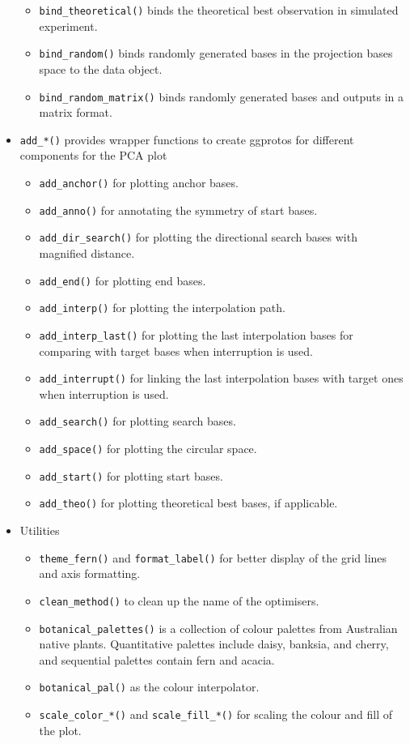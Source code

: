 \begin{itemize}
  \begin{itemize}
  \tightlist
  \item
    \texttt{bind\_theoretical()} binds the theoretical best observation in simulated experiment.
  \item
    \texttt{bind\_random()} binds randomly generated bases in the projection bases space to the data object.
  \item
    \texttt{bind\_random\_matrix()} binds randomly generated bases and outputs in a matrix format.
  \end{itemize}
\item
  \texttt{add\_*()} provides wrapper functions to create ggprotos for different components for the PCA plot

  \begin{itemize}
  \tightlist
  \item
    \texttt{add\_anchor()} for plotting anchor bases.
  \item
    \texttt{add\_anno()} for annotating the symmetry of start bases.
  \item
    \texttt{add\_dir\_search()} for plotting the directional search bases with magnified distance.
  \item
    \texttt{add\_end()} for plotting end bases.
  \item
    \texttt{add\_interp()} for plotting the interpolation path.
  \item
    \texttt{add\_interp\_last()} for plotting the last interpolation bases for comparing with target bases when interruption is used.
  \item
    \texttt{add\_interrupt()} for linking the last interpolation bases with target ones when interruption is used.
  \item
    \texttt{add\_search()} for plotting search bases.
  \item
    \texttt{add\_space()} for plotting the circular space.
  \item
    \texttt{add\_start()} for plotting start bases.
  \item
    \texttt{add\_theo()} for plotting theoretical best bases, if applicable.
  \end{itemize}
\item
  Utilities

  \begin{itemize}
  \tightlist
  \item
    \texttt{theme\_fern()} and \texttt{format\_label()} for better display of the grid lines and axis formatting.
  \item
    \texttt{clean\_method()} to clean up the name of the optimisers.
  \item
    \texttt{botanical\_palettes()} is a collection of colour palettes from Australian native plants. Quantitative palettes include daisy, banksia, and cherry, and sequential palettes contain fern and acacia.
  \item
    \texttt{botanical\_pal()} as the colour interpolator.
  \item
    \texttt{scale\_color\_*()} and \texttt{scale\_fill\_*()} for scaling the colour and fill of the plot.
  \end{itemize}
\end{itemize}

